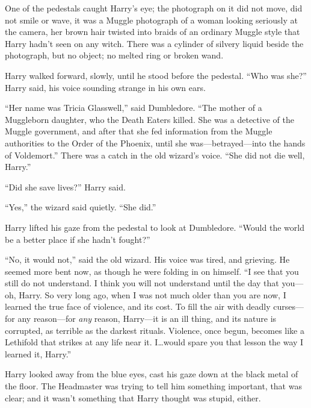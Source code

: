 One of the pedestals caught Harry’s eye; the photograph on it did not move, did not smile or wave, it was a Muggle photograph of a woman looking seriously at the camera, her brown hair twisted into braids of an ordinary Muggle style that Harry hadn’t seen on any witch. There was a cylinder of silvery liquid beside the photograph, but no object; no melted ring or broken wand.

Harry walked forward, slowly, until he stood before the pedestal. “Who was she?” Harry said, his voice sounding strange in his own ears.

“Her name was Tricia Glasswell,” said Dumbledore. “The mother of a Muggleborn daughter, who the Death Eaters killed. She was a detective of the Muggle government, and after that she fed information from the Muggle authorities to the Order of the Phoenix, until she was—betrayed—into the hands of Voldemort.” There was a catch in the old wizard’s voice. “She did not die well, Harry.”

“Did she save lives?” Harry said.

“Yes,” the wizard said quietly. “She did.”

Harry lifted his gaze from the pedestal to look at Dumbledore. “Would the world be a better place if she hadn’t fought?”

“No, it would not,” said the old wizard. His voice was tired, and grieving. He seemed more bent now, as though he were folding in on himself. “I see that you still do not understand. I think you will not understand until the day that you—oh, Harry. So very long ago, when I was not much older than you are now, I learned the true face of violence, and its cost. To fill the air with deadly curses—for any reason—for \emph{any} reason, Harry—it is an ill thing, and its nature is corrupted, as terrible as the darkest rituals. Violence, once begun, becomes like a Lethifold that strikes at any life near it. I…would spare you that lesson the way I learned it, Harry.”

Harry looked away from the blue eyes, cast his gaze down at the black metal of the floor. The Headmaster was trying to tell him something important, that was clear; and it wasn’t something that Harry thought was stupid, either.

